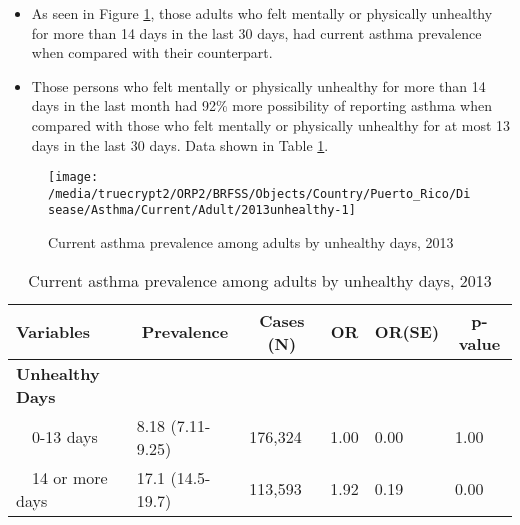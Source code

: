 \newpage
\begin{itemize}

\item As seen in Figure \ref{fig:unhlthy.Asthma.2013}, those adults who felt mentally or physically unhealthy for more than 14 days in the last 30 days, had  
current asthma prevalence when compared with their counterpart.


\item Those persons who felt mentally or physically unhealthy for more than 14 days in the last month had 92\% more possibility of reporting asthma when compared with those who felt mentally or physically unhealthy for at most 13 days in the last 30 days. Data shown in Table \ref{tab:unhlthy.Asthma.2013}.

\end{itemize}

\begin{figure}[H]
\caption{Current asthma prevalence among adults by unhealthy days, 2013}
\label{fig:unhlthy.Asthma.2013}

\begin{knitrout}
\color{fgcolor}

{\centering \texttt{[image: /media/truecrypt2/ORP2/BRFSS/Objects/Country/Puerto\_Rico/Disease/Asthma/Current/Adult/2013unhealthy-1]} 

}



\end{knitrout}
\end{figure}

\begin{table}[H]
\caption{Current asthma prevalence among adults by unhealthy days, 2013\label{tab:unhlthy.Asthma.2013}} 
\begin{center}
\begin{tabular}{llllll}
\hline\hline
\multicolumn{1}{l}{Variables}&\multicolumn{1}{c}{Prevalence}&\multicolumn{1}{c}{Cases (N)}&\multicolumn{1}{c}{OR}&\multicolumn{1}{c}{OR(SE)}&\multicolumn{1}{c}{p-value}\tabularnewline
\hline
{\bfseries Unhealthy Days}&&&&&\tabularnewline
~~0-13 days&8.18 (7.11-9.25)&176,324&1.00&0.00&1.00\tabularnewline
~~14 or more days&17.1 (14.5-19.7)&113,593&1.92&0.19&0.00\tabularnewline
\hline
\end{tabular}\end{center}

\end{table}


